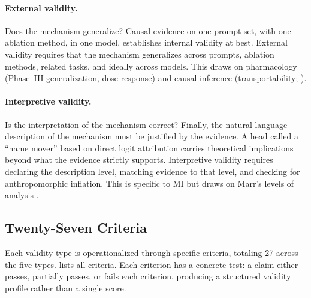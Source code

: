 \documentclass[10pt]{article}
\begin{document}
\paragraph{External validity.} Does the mechanism generalize? Causal evidence on one prompt set, with one ablation method, in one model, establishes internal validity at best. External validity requires that the mechanism generalizes across prompts, ablation methods, related tasks, and ideally across models. This draws on pharmacology (Phase~III generalization, dose-response) and causal inference (transportability; \citealp{pearl2011transportability}).

\paragraph{Interpretive validity.} Is the interpretation of the mechanism correct? Finally, the natural-language description of the mechanism must be justified by the evidence. A head called a ``name mover'' based on direct logit attribution carries theoretical implications beyond what the evidence strictly supports. Interpretive validity requires declaring the description level, matching evidence to that level, and checking for anthropomorphic inflation. This is specific to MI but draws on Marr's levels of analysis \citep{marr1982vision}.

\subsection{Twenty-Seven Criteria}
\label{sec:criteria}

Each validity type is operationalized through specific criteria, totaling 27 across the five types.  lists all criteria. Each criterion has a concrete test: a claim either passes, partially passes, or fails each criterion, producing a structured validity profile rather than a single score.
\end{document}
